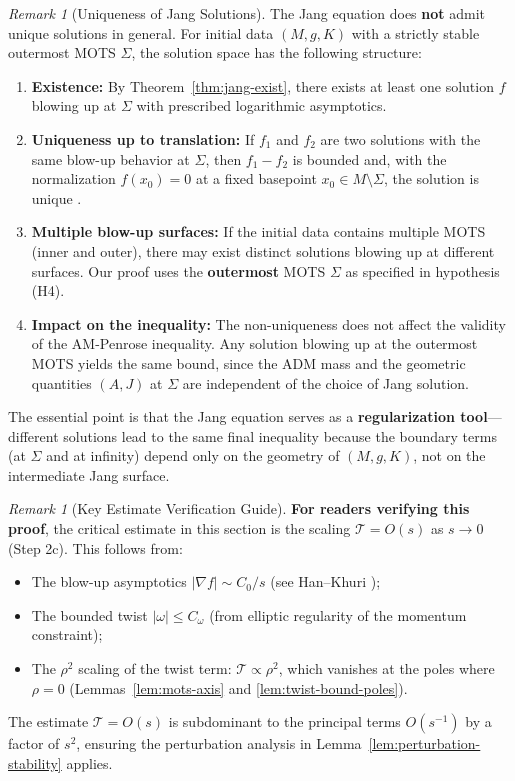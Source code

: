 \documentclass[12pt]{article}
\theoremstyle{plain}
\theoremstyle{definition}
\theoremstyle{remark}
\newtheorem{remark}[theorem]{Remark}
\begin{document}
\begin{remark}[Uniqueness of Jang Solutions]\label{rem:jang-uniqueness}
The Jang equation does \textbf{not} admit unique solutions in general. For initial data $(M, g, K)$ with a strictly stable outermost MOTS $\Sigma$, the solution space has the following structure:
\begin{enumerate}
    \item \textbf{Existence:} By Theorem~\ref{thm:jang-exist}, there exists at least one solution $f$ blowing up at $\Sigma$ with prescribed logarithmic asymptotics.
    
    \item \textbf{Uniqueness up to translation:} If $f_1$ and $f_2$ are two solutions with the same blow-up behavior at $\Sigma$, then $f_1 - f_2$ is bounded and, with the normalization $f(x_0) = 0$ at a fixed basepoint $x_0 \in M \setminus \Sigma$, the solution is unique \cite[Theorem 3.1]{hankhuri2013}.
    
    \item \textbf{Multiple blow-up surfaces:} If the initial data contains multiple MOTS (inner and outer), there may exist distinct solutions blowing up at different surfaces. Our proof uses the \textbf{outermost} MOTS $\Sigma$ as specified in hypothesis (H4).
    
    \item \textbf{Impact on the inequality:} The non-uniqueness does not affect the validity of the AM-Penrose inequality. Any solution blowing up at the outermost MOTS yields the same bound, since the ADM mass and the geometric quantities $(A, J)$ at $\Sigma$ are independent of the choice of Jang solution.
\end{enumerate}
The essential point is that the Jang equation serves as a \textbf{regularization tool}---different solutions lead to the same final inequality because the boundary terms (at $\Sigma$ and at infinity) depend only on the geometry of $(M, g, K)$, not on the intermediate Jang surface.
\end{remark}

\begin{remark}[Key Estimate Verification Guide]\label{rem:verification-jang}
\textbf{For readers verifying this proof}, the critical estimate in this section is the scaling $\mathcal{T} = O(s)$ as $s \to 0$ (Step 2c). This follows from:
\begin{itemize}
    \item The blow-up asymptotics $|\nabla f| \sim C_0/s$ (see Han--Khuri \cite{hankhuri2013});
    \item The bounded twist $|\omega| \leq C_\omega$ (from elliptic regularity of the momentum constraint);
    \item The $\rho^2$ scaling of the twist term: $\mathcal{T} \propto \rho^2$, which vanishes at the poles where $\rho = 0$ (Lemmas~\ref{lem:mots-axis} and \ref{lem:twist-bound-poles}).
\end{itemize}
The estimate $\mathcal{T} = O(s)$ is subdominant to the principal terms $O(s^{-1})$ by a factor of $s^2$, ensuring the perturbation analysis in Lemma~\ref{lem:perturbation-stability} applies.
\end{remark}
\end{document}
